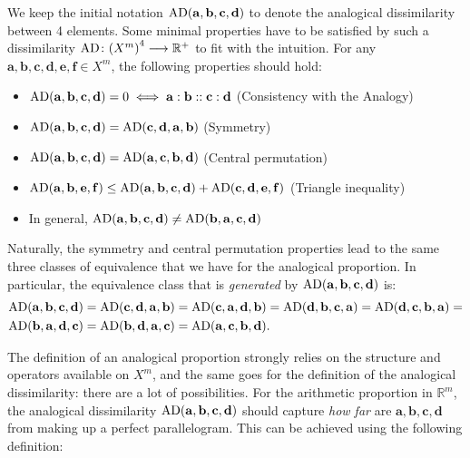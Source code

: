 We keep the initial notation $\text{AD}(\mathbf{a}, \mathbf{b},
\mathbf{c},\mathbf{d})$ to denote the analogical dissimilarity between 4
elements.  Some  minimal properties have to be satisfied by such a
dissimilarity $\text{AD} \colon {(X^m)}^4 \longrightarrow \mathbb{R}^+$ to fit
with the intuition. For any $\mathbf{a}, \mathbf{b},\mathbf{c},\mathbf{d},
\mathbf{e}, \mathbf{f} \in X^m$, the following properties should hold:
\begin{itemize}
  \item $\text{AD}(\mathbf{a}, \mathbf{b},\mathbf{c},\mathbf{d})=0 \iff \mathbf{a} :
    \mathbf{b}:: \mathbf{c} : \mathbf{d}$ (Consistency with the Analogy)
  \item $\text{AD}(\mathbf{a}, \mathbf{b},\mathbf{c},\mathbf{d})=
    \text{AD}(\mathbf{c}, \mathbf{d},\mathbf{a},\mathbf{b})$ (Symmetry)
  \item $\text{AD}(\mathbf{a}, \mathbf{b},\mathbf{c},\mathbf{d})=
    \text{AD}(\mathbf{a}, \mathbf{c},\mathbf{b},\mathbf{d})$ (Central permutation)
  \item $\text{AD}(\mathbf{a}, \mathbf{b},\mathbf{e},\mathbf{f}) \leq \text{AD}(\mathbf{a},
    \mathbf{b},\mathbf{c},\mathbf{d}) + \text{AD}(\mathbf{c},
    \mathbf{d},\mathbf{e},\mathbf{f})$ (Triangle inequality)
  \item In general, $\text{AD}(\mathbf{a}, \mathbf{b},\mathbf{c},\mathbf{d}) \neq
    \text{AD}(\mathbf{b}, \mathbf{a},\mathbf{c},\mathbf{d})$
\end{itemize}
Naturally, the symmetry and central permutation properties lead to the same
three classes of equivalence that we have for the analogical proportion. In
particular, the equivalence class that is \textit{generated} by
$\text{AD}(\mathbf{a}, \mathbf{b},\mathbf{c},\mathbf{d})$ is:
\begin{align*}
  &\text{AD}(\mathbf{a}, \mathbf{b},\mathbf{c},\mathbf{d}) =
\text{AD}(\mathbf{c}, \mathbf{d},\mathbf{a},\mathbf{b})=
\text{AD}(\mathbf{c}, \mathbf{a},\mathbf{d},\mathbf{b})=
\text{AD}(\mathbf{d}, \mathbf{b},\mathbf{c},\mathbf{a})=
\text{AD}(\mathbf{d}, \mathbf{c},\mathbf{b},\mathbf{a})=\\
  &\text{AD}(\mathbf{b}, \mathbf{a},\mathbf{d},\mathbf{c})=
\text{AD}(\mathbf{b}, \mathbf{d},\mathbf{a},\mathbf{c})=
\text{AD}(\mathbf{a}, \mathbf{c},\mathbf{b},\mathbf{d}).
\end{align*}

The definition of an analogical proportion strongly relies on the structure and
operators available on $X^m$, and the same goes for the definition of the
analogical dissimilarity: there are a lot of possibilities. For the arithmetic
proportion in $\mathbb{R}^m$, the analogical dissimilarity  $\text{AD}(\mathbf{a},
\mathbf{b},\mathbf{c},\mathbf{d})$ should capture \textit{how far}
are $\mathbf{a}, \mathbf{b},\mathbf{c},\mathbf{d}$ from making up a perfect
parallelogram. This can be achieved using the following definition:

